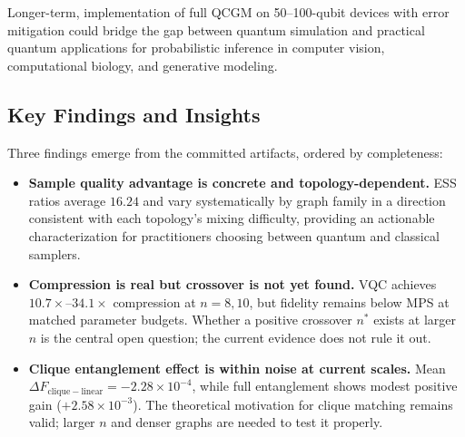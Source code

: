     Longer-term, implementation of full QCGM on 50--100-qubit devices with
    error mitigation could bridge the gap between quantum simulation and
    practical quantum applications for probabilistic inference in computer
    vision, computational biology, and generative modeling.
    
    
    
    \subsection{Key Findings and Insights}
    
    Three findings emerge from the committed artifacts, ordered by
    completeness:
    \begin{itemize}[leftmargin=*, topsep=0pt, partopsep=0pt,
                    itemsep=3pt, parsep=0pt]
        \item \textbf{Sample quality advantage is concrete and
        topology-dependent.} ESS ratios average $16.24$ and vary
        systematically by graph family in a direction consistent with
        each topology's mixing difficulty, providing an actionable
        characterization for practitioners choosing between quantum and
        classical samplers.
    
        \item \textbf{Compression is real but crossover is not yet
        found.} VQC achieves $10.7\times$--$34.1\times$ compression at
        $n = 8, 10$, but fidelity remains below MPS at matched parameter
        budgets. Whether a positive crossover $n^*$ exists at larger $n$
        is the central open question; the current evidence does not
        rule it out.
    
        \item \textbf{Clique entanglement effect is within noise at
        current scales.} Mean $\Delta F_{\mathrm{clique-linear}} =
        -2.28 \times 10^{-4}$, while full entanglement shows modest
        positive gain ($+2.58 \times 10^{-3}$). The theoretical
        motivation for clique matching remains valid; larger $n$ and
        denser graphs are needed to test it properly.
    \end{itemize}
    
